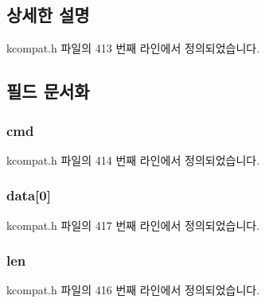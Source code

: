 \subsection{상세한 설명}


kcompat.\+h 파일의 413 번째 라인에서 정의되었습니다.



\subsection{필드 문서화}
\subsubsection[{\texorpdfstring{cmd}{cmd}}]{ cmd}\hypertarget{structethtool__gstrings_a62fe2a1dbf17d5a8561a5a7f5a97a9ba}{}\label{structethtool__gstrings_a62fe2a1dbf17d5a8561a5a7f5a97a9ba}


kcompat.\+h 파일의 414 번째 라인에서 정의되었습니다.

\subsubsection[{\texorpdfstring{data}{data}}]{ data\mbox{[}0\mbox{]}}\hypertarget{structethtool__gstrings_a2873fa0c210cc63894b6cbb14e1a1330}{}\label{structethtool__gstrings_a2873fa0c210cc63894b6cbb14e1a1330}


kcompat.\+h 파일의 417 번째 라인에서 정의되었습니다.

\subsubsection[{\texorpdfstring{len}{len}}]{ len}\hypertarget{structethtool__gstrings_a4105737bcbe35c1fd69996a085d8231a}{}\label{structethtool__gstrings_a4105737bcbe35c1fd69996a085d8231a}


kcompat.\+h 파일의 416 번째 라인에서 정의되었습니다.

